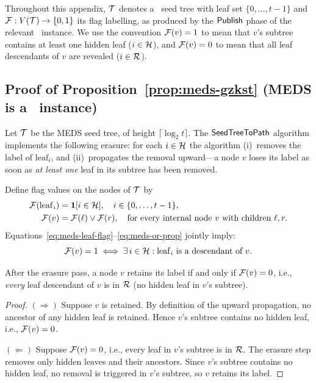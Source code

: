 
Throughout this appendix, $\mathcal{T}$ denotes a \GGM\ seed tree with leaf set
$\{0,\ldots,t-1\}$ and $\mathcal{F} : V(\mathcal{T}) \to \{0,1\}$ its flag labelling,
as produced by the $\mathsf{Publish}$ phase of the relevant \GZKST\ instance.
We use the convention $\mathcal{F}(v) = 1$ to mean that $v$'s subtree contains at
least one hidden leaf ($i \in \mathcal{H}$), and $\mathcal{F}(v) = 0$ to mean that all
leaf descendants of $v$ are revealed ($i \in \mathcal{R}$).

\subsection{Proof of Proposition~\ref{prop:meds-gzkst}
  (MEDS is a \GZKST\ instance)}
\label{app:proof-meds}

Let $\mathcal{T}$ be the MEDS seed tree, of height $\lceil \log_2 t \rceil$.
The $\mathsf{SeedTreeToPath}$ algorithm implements the following erasure: for each
$i \in \mathcal{H}$ the algorithm (i)~removes the label of $\mathrm{leaf}_i$, and
(ii)~propagates the removal upward---a node $v$ loses its label as soon as
\emph{at least one} leaf in its subtree has been removed.

Define flag values on the nodes of $\mathcal{T}$ by
\begin{align}
  \mathcal{F}(\mathrm{leaf}_i) &= \mathbf{1}[i \in \mathcal{H}],
    \quad i \in \{0,\ldots,t-1\},
  \label{eq:meds-leaf-flag}\\
  \mathcal{F}(v) &= \mathcal{F}(\ell) \vee \mathcal{F}(r),
    \quad \text{for every internal node } v \text{ with children } \ell, r.
  \label{eq:meds-or-prop}
\end{align}
Equations~\eqref{eq:meds-leaf-flag}--\eqref{eq:meds-or-prop} jointly imply:
\begin{equation}
  \mathcal{F}(v) = 1 \iff \exists\,i \in \mathcal{H} : \mathrm{leaf}_i
  \text{ is a descendant of } v.
  \label{eq:meds-flag-char}
\end{equation}

\begin{claim}
\label{claim:meds-retain}
After the erasure pass, a node $v$ retains its label if and only if
$\mathcal{F}(v) = 0$, i.e., \emph{every} leaf descendant of $v$ is in $\mathcal{R}$
(no hidden leaf in $v$'s subtree).
\end{claim}

\begin{proof}
$(\Rightarrow)$
Suppose $v$ is retained.  By definition of the upward propagation, no
ancestor of any hidden leaf is retained.  Hence $v$'s subtree contains no
hidden leaf, i.e., $\mathcal{F}(v) = 0$.

$(\Leftarrow)$
Suppose $\mathcal{F}(v) = 0$, i.e., every leaf in $v$'s subtree is in $\mathcal{R}$.
The erasure step removes only hidden leaves and their ancestors.  Since
$v$'s subtree contains no hidden leaf, no removal is triggered in
$v$'s subtree, so $v$ retains its label.
\end{proof}


